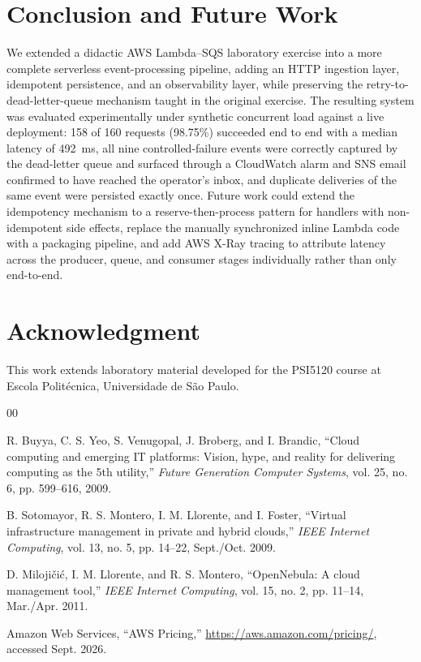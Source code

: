 \documentclass[conference]{IEEEtran}
\begin{document}
\section{Conclusion and Future Work}

We extended a didactic AWS Lambda--SQS laboratory exercise into a more complete serverless event-processing pipeline, adding an HTTP ingestion layer, idempotent persistence, and an observability layer, while preserving the retry-to-dead-letter-queue mechanism taught in the original exercise. The resulting system was evaluated experimentally under synthetic concurrent load against a live deployment: 158 of 160 requests (98.75\%) succeeded end to end with a median latency of 492~ms, all nine controlled-failure events were correctly captured by the dead-letter queue and surfaced through a CloudWatch alarm and SNS email confirmed to have reached the operator's inbox, and duplicate deliveries of the same event were persisted exactly once. Future work could extend the idempotency mechanism to a reserve-then-process pattern for handlers with non-idempotent side effects, replace the manually synchronized inline Lambda code with a packaging pipeline, and add AWS X-Ray tracing to attribute latency across the producer, queue, and consumer stages individually rather than only end-to-end.

\section*{Acknowledgment}
This work extends laboratory material developed for the PSI5120 course at Escola Politécnica, Universidade de São Paulo.

\begin{thebibliography}{00}

R. Buyya, C. S. Yeo, S. Venugopal, J. Broberg, and I. Brandic, ``Cloud computing and emerging IT platforms: Vision, hype, and reality for delivering computing as the 5th utility,'' \emph{Future Generation Computer Systems}, vol. 25, no. 6, pp. 599--616, 2009.

B. Sotomayor, R. S. Montero, I. M. Llorente, and I. Foster, ``Virtual infrastructure management in private and hybrid clouds,'' \emph{IEEE Internet Computing}, vol. 13, no. 5, pp. 14--22, Sept./Oct. 2009.

D. Milojičić, I. M. Llorente, and R. S. Montero, ``OpenNebula: A cloud management tool,'' \emph{IEEE Internet Computing}, vol. 15, no. 2, pp. 11--14, Mar./Apr. 2011.

Amazon Web Services, ``AWS Pricing,'' \url{https://aws.amazon.com/pricing/}, accessed Sept. 2026.

\end{thebibliography}
\end{document}
